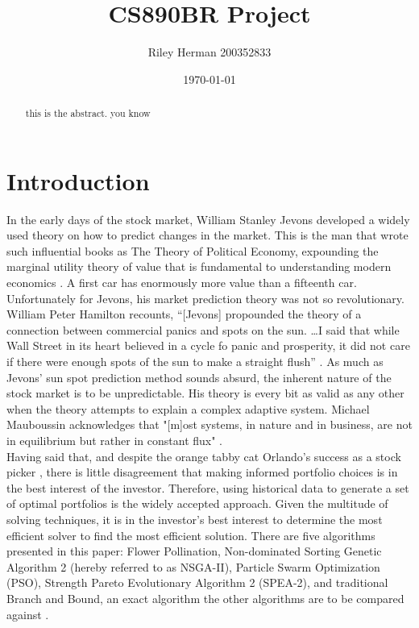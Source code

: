 \documentclass{article}
\title{CS890BR Project}
\date{\today}
\author{Riley Herman 200352833}
\begin{document}
    \maketitle
    \begin{abstract}
        this is the abstract. you know
    \end{abstract}
    \newpage
    \section{Introduction}
    In the early days of the stock market, William Stanley Jevons developed a widely used theory on how to predict changes in the market.
    This is the man that wrote such influential books as The Theory of Political Economy, expounding the marginal utility theory of value that 
    is fundamental to understanding modern economics \cite{Jevons}. A first car has enormously more value than a fifteenth car. Unfortunately for Jevons, 
    his market prediction theory was not so revolutionary. William Peter Hamilton recounts, ``[Jevons] propounded the theory of a connection between 
    commercial panics and spots on the sun. \ldots I said that while Wall Street in its heart believed in a cycle fo panic and prosperity, 
    it did not care if there were enough spots of the sun to make a straight flush'' \cite{Hamilton}. As much as Jevons' sun spot prediction method
    sounds absurd, the inherent nature of the stock market is to be unpredictable. His theory is every bit as valid as any other when the theory 
    attempts to explain a complex adaptive system. Michael Mauboussin acknowledges that "[m]ost systems, in nature and in business,
    are not in equilibrium but rather in constant flux" \cite{Mauboussin}. \\
    Having said that, and despite the orange tabby cat Orlando's success as a stock picker \cite{King}, there is little disagreement that making
    informed portfolio choices is in the best interest of the investor. Therefore, using historical data to generate a set of optimal portfolios
    is the widely accepted approach. Given the multitude of solving techniques, it is in the investor's best interest to determine the most efficient solver
    to find the most efficient solution. There are five algorithms presented in this paper: Flower Pollination, Non-dominated Sorting Genetic 
    Algorithm 2 (hereby referred to as NSGA-II), Particle Swarm Optimization (PSO), Strength Pareto Evolutionary Algorithm 2 (SPEA-2), and traditional
    Branch and Bound, an exact algorithm the other algorithms are to be compared against \cite{Yang} \cite{KaucicMoradiMirzazadeh} \cite{Guerard}. 
\end{document}
